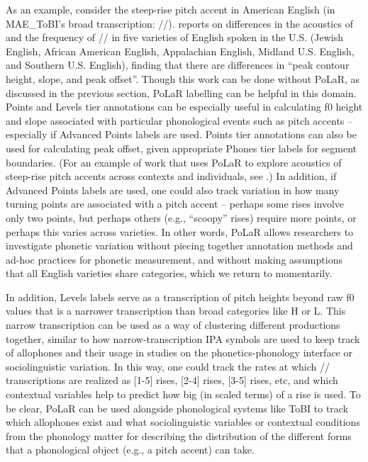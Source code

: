 \documentclass[11pt, twoside]{memoir}
\def\textlabel#1{{\relsize{-.5}\fontspec[Mapping=tex-text]{Roboto Mono}{#1}}}
\begin{document}
As an example, consider the steep-rise pitch accent in American English (in MAE\_ToBI’s broad transcription: /\textlabel{L+H*}/). \citealt{burdin-18} reports on differences in the acoustics of and the frequency of /\textlabel{L+H*}/ in five varieties of English spoken in the U.S. (Jewish English, African American English, Appalachian English, Midland U.S. English, and Southern U.S. English), finding that there are differences in “peak contour height, slope, and peak offset”. Though this work can be done without PoLaR, as discussed in the previous section, PoLaR labelling can be helpful in this domain. Points and Levels tier annotations can be especially useful in calculating f0 height and slope associated with particular phonological events such as pitch accents – especially if Advanced Points labels are used. Points tier annotations can also be used for calculating peak offset, given appropriate Phones tier labels for segment boundaries. (For an example of work that uses PoLaR to explore acoustics of steep-rise pitch accents across contexts and individuals, see \citealt{holliday21a}.)  In addition, if Advanced Points labels are used, one could also track variation in how many turning points are associated with a pitch accent – perhaps some rises involve only two points, but perhaps others (e.g., “scoopy” rises) require more points, or perhaps this varies across varieties. In other words, PoLaR allows researchers to investigate phonetic variation without piecing together annotation methods and ad-hoc practices for phonetic measurement, and without making assumptions that all English varieties share categories, which we return to momentarily.

In addition, Levels labels serve as a transcription of pitch heights beyond raw f0 values that is a narrower transcription than broad categories like H or L. This narrow transcription can be used as a way of clustering different productions together, similar to how narrow-transcription IPA symbols are used to keep track of allophones and their usage in studies on the phonetics-phonology interface or sociolinguistic variation. In this way, one could track the rates at which /\textlabel{L+H*}/ transcriptions are realized as [1-5] rises, [2-4] rises, [3-5] rises, etc, and which contextual variables help to predict how big (in scaled terms) of a rise is used. To be clear, PoLaR can be used alongside phonological systems like ToBI to track which allophones exist and what sociolinguistic variables or contextual conditions from the phonology matter for describing the distribution of the different forms that a phonological object (e.g., a pitch accent) can take.
\end{document}
